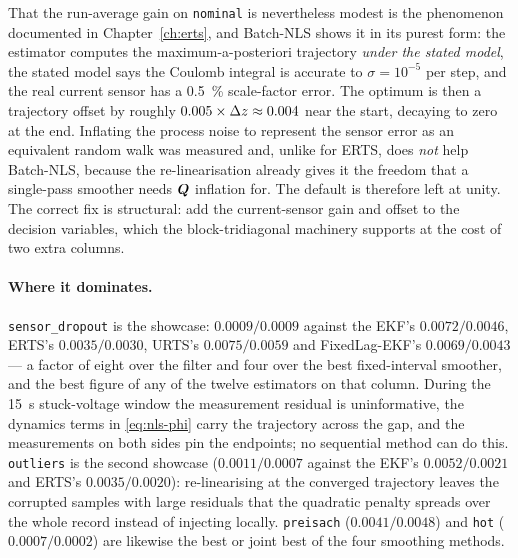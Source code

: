 That the run-average gain on \texttt{nominal} is nevertheless modest is the phenomenon documented in
Chapter~\ref{ch:erts}, and Batch-NLS shows it in its purest form: the estimator computes the
maximum-a-posteriori trajectory \emph{under the stated model}, the stated model says the Coulomb
integral is accurate to $\sigma=10^{-5}$ per step, and the real current sensor has a
\SI{0.5}{\percent} scale-factor error.  The optimum is then a trajectory offset by roughly
$0.005\times\Delta z\approx0.004$ near the start, decaying to zero at the end.  Inflating the
process noise to represent the sensor error as an equivalent random walk was measured and, unlike
for ERTS, does \emph{not} help Batch-NLS, because the re-linearisation already gives it the freedom
that a single-pass smoother needs $\bm{Q}$ inflation for.  The default is therefore left at unity.  The
correct fix is structural: add the current-sensor gain and offset to the decision variables, which
the block-tridiagonal machinery supports at the cost of two extra columns.

\paragraph{Where it dominates.}  \texttt{sensor\_dropout} is the showcase: $0.0009/0.0009$ against
the EKF's $0.0072/0.0046$, ERTS's $0.0035/0.0030$, URTS's $0.0075/0.0059$ and FixedLag-EKF's
$0.0069/0.0043$ --- a factor of eight over the filter and four over the best fixed-interval smoother,
and the best figure of any of the twelve estimators on that column.  During the \SI{15}{\second}
stuck-voltage window the measurement residual is uninformative, the dynamics terms in
\eqref{eq:nls-phi} carry the trajectory across the gap, and the measurements on both sides pin the
endpoints; no sequential method can do this.  \texttt{outliers} is the second showcase
($0.0011/0.0007$ against the EKF's $0.0052/0.0021$ and ERTS's $0.0035/0.0020$): re-linearising at
the converged trajectory leaves the corrupted samples with large residuals that the quadratic
penalty spreads over the whole record instead of injecting locally.  \texttt{preisach}
($0.0041/0.0048$) and \texttt{hot} ($0.0007/0.0002$) are likewise the best or joint best of the four
smoothing methods.

